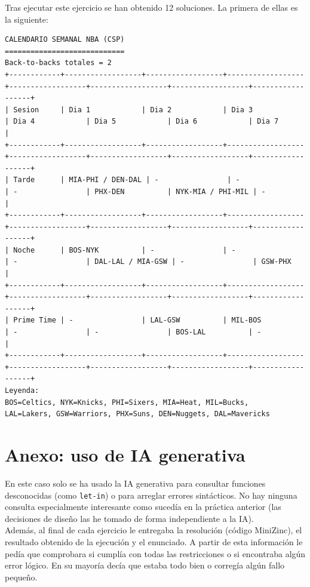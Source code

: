 \documentclass[11pt]{article}
\begin{document}
Tras ejecutar este ejercicio se han obtenido 12 soluciones. La primera de ellas es la siguiente:
\begin{lstlisting}[basicstyle=\ttfamily\fontsize{4.9}{6}\selectfont]
CALENDARIO SEMANAL NBA (CSP)
============================
Back-to-backs totales = 2
+------------+------------------+------------------+------------------+------------------+------------------+------------------+------------------+
| Sesion     | Dia 1            | Dia 2            | Dia 3            | Dia 4            | Dia 5            | Dia 6            | Dia 7            |
+------------+------------------+------------------+------------------+------------------+------------------+------------------+------------------+
| Tarde      | MIA-PHI / DEN-DAL | -                | -                | -                | PHX-DEN          | NYK-MIA / PHI-MIL | -                | 
+------------+------------------+------------------+------------------+------------------+------------------+------------------+------------------+
| Noche      | BOS-NYK          | -                | -                | -                | DAL-LAL / MIA-GSW | -                | GSW-PHX          | 
+------------+------------------+------------------+------------------+------------------+------------------+------------------+------------------+
| Prime Time | -                | LAL-GSW          | MIL-BOS          | -                | -                | BOS-LAL          | -                | 
+------------+------------------+------------------+------------------+------------------+------------------+------------------+------------------+
Leyenda:
BOS=Celtics, NYK=Knicks, PHI=Sixers, MIA=Heat, MIL=Bucks,
LAL=Lakers, GSW=Warriors, PHX=Suns, DEN=Nuggets, DAL=Mavericks
\end{lstlisting}

\section*{Anexo: uso de IA generativa}
En este caso solo se ha usado la IA generativa para consultar funciones desconocidas (como \verb|let-in|) o para arreglar errores sintácticos. No hay ninguna consulta especialmente interesante como sucedía en la práctica anterior (las decisiones de diseño las he tomado de forma independiente a la IA).\\

Además, al final de cada ejercicio le entregaba la resolución (código MiniZinc), el resultado obtenido de la ejecución y el enunciado. A partir de esta información le pedía que comprobara si cumplía con todas las restricciones o si encontraba algún error lógico. En su mayoría decía que estaba todo bien o corregía algún fallo pequeño.
\end{document}
